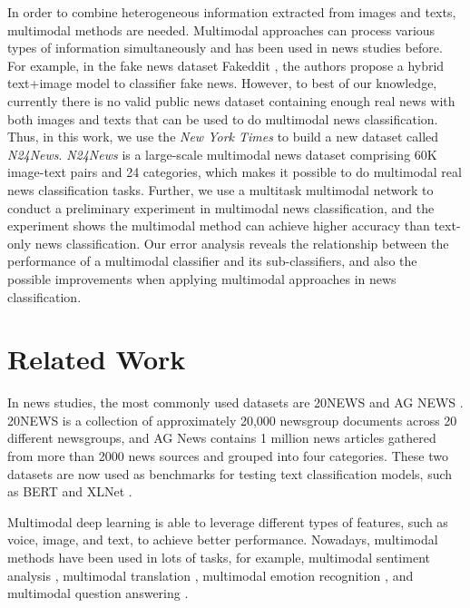 \documentclass[10pt, a4paper]{article}
\begin{document}
In order to combine heterogeneous information extracted from images and texts, multimodal methods are needed. Multimodal approaches can process various types of information simultaneously and has been used in news studies before.
For example, in the fake news dataset Fakeddit , the authors propose a hybrid text+image model to classifier fake news.
However, to best of our knowledge, currently there is no valid public news dataset containing enough real news with both images and texts that can be used to do multimodal news classification. 
Thus, in this work, we use the \textit{New York Times} to build a new dataset called \textit{N24News}. 
\textit{N24News} is a large-scale multimodal news dataset comprising 60K image-text pairs and 24 categories, which makes it possible to do multimodal real news classification tasks.
Further, we use a multitask multimodal network to conduct a preliminary experiment in multimodal news classification, and the experiment shows the multimodal method can achieve higher accuracy than text-only news classification.
Our error analysis reveals the relationship between the performance of a multimodal classifier and its sub-classifiers, and also the possible improvements when applying multimodal approaches in news classification.




\section{Related Work}

In news studies, the most commonly used datasets are 20NEWS  and AG NEWS . 20NEWS is a collection of approximately 20,000 newsgroup documents across 20 different newsgroups, and AG News contains 1 million news articles gathered from more than 2000 news sources and grouped into four categories. These two datasets are now used as benchmarks for testing text classification models, such as BERT \cite{devlin2018bert} and XLNet \cite{yang2019xlnet}. 


Multimodal deep learning \cite{ngiam2011multimodal} is able to leverage different types of features, such as voice, image, and text, to achieve better performance. 
Nowadays, multimodal methods have been used in lots of tasks, for example, multimodal sentiment analysis \cite{soleymani2017survey}, multimodal translation , multimodal emotion recognition \cite{tzirakis2017end}, and multimodal question answering . 
\end{document}
